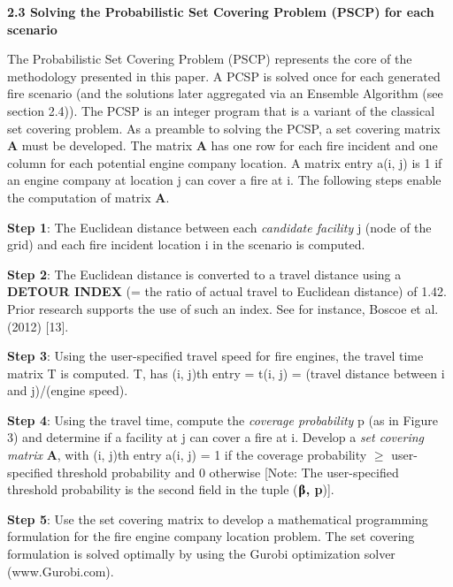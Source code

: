 \documentclass{article} %
\begin{document}
\noindent 

\noindent \textbf{2.3 Solving the Probabilistic Set Covering Problem (PSCP) for each scenario}

\noindent The Probabilistic Set Covering Problem (PSCP) represents the core of the methodology presented in this paper.  A PCSP is solved once for each generated fire scenario (and the solutions later aggregated via an Ensemble Algorithm (see section 2.4)).  The PCSP is an integer program that is a variant of the classical set covering problem.  As a preamble to solving the PCSP, a set covering matrix \textbf{A} must be developed.  The matrix \textbf{A} has one row for each fire incident and one column for each potential engine company location.  A matrix entry     a(i, j) is 1 if an engine company at location j can cover a fire at i.  The following steps enable the computation of matrix \textbf{A}.   

\noindent \textbf{Step 1}: The Euclidean distance between each \textit{candidate facility} j (node of the grid) and each fire incident location i in the scenario is computed.

\noindent \textbf{Step 2}: The Euclidean distance is converted to a travel distance using a \textbf{DETOUR INDEX} (=  the ratio of actual travel to Euclidean distance) of 1.42.  Prior research supports the use of such an index.  See for instance, Boscoe et al. (2012) [13].

\noindent \textbf{Step 3}: Using the user-specified travel speed for fire engines, the travel time matrix T is computed.  T, has (i, j)th entry = t(i, j) = (travel distance between i and j)/(engine speed). 

\noindent \textbf{Step 4}:  Using the travel time, compute the \textit{coverage probability} p (as in Figure 3) and determine if a facility at j can cover a fire at i.  Develop a \textit{set covering matrix} \textbf{A}, with (i, j)th entry a(i, j) = 1 if the coverage probability  $\mathrm{\ge}$  user-specified threshold probability and 0 otherwise [Note: The user-specified threshold probability is the second field in the tuple (\textbf{$\boldsymbol{\betaup}$, p})].

\noindent \textbf{Step 5}:  Use the set covering matrix to develop a mathematical programming formulation for the fire engine company location problem.  The set covering formulation is solved optimally by using the Gurobi optimization solver (www.Gurobi.com).

\noindent 
\end{document}
